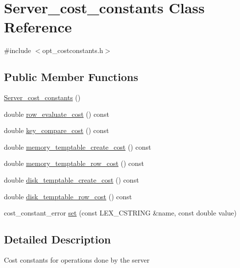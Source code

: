 \hypertarget{classServer__cost__constants}{}\section{Server\+\_\+cost\+\_\+constants Class Reference}
\label{classServer__cost__constants}


{\ttfamily \#include $<$opt\+\_\+costconstants.\+h$>$}

\subsection*{Public Member Functions}
\begin{DoxyCompactItemize}
\item 
\mbox{\hyperlink{classServer__cost__constants_ae46163107975303a2a4b5777b15989ee}{Server\+\_\+cost\+\_\+constants}} ()
\item 
double \mbox{\hyperlink{classServer__cost__constants_a0e8899c1b50ebe6a35a5bc4607c2eeef}{row\+\_\+evaluate\+\_\+cost}} () const
\item 
double \mbox{\hyperlink{classServer__cost__constants_afd5d1ddd74b8f18b52945fadce7fd1d8}{key\+\_\+compare\+\_\+cost}} () const
\item 
double \mbox{\hyperlink{classServer__cost__constants_a350765cfa9933e749b5c8098df8e1035}{memory\+\_\+temptable\+\_\+create\+\_\+cost}} () const
\item 
double \mbox{\hyperlink{classServer__cost__constants_a9de227818ce128b4f0dfc64d997f48df}{memory\+\_\+temptable\+\_\+row\+\_\+cost}} () const
\item 
double \mbox{\hyperlink{classServer__cost__constants_aef84ea79662a33a49a8393a71be58e79}{disk\+\_\+temptable\+\_\+create\+\_\+cost}} () const
\item 
double \mbox{\hyperlink{classServer__cost__constants_a21e6450b221e901707f374cfa5820bf4}{disk\+\_\+temptable\+\_\+row\+\_\+cost}} () const
\item 
cost\+\_\+constant\+\_\+error \mbox{\hyperlink{classServer__cost__constants_a5dff135f3610f4f0226debac4d13eeb9}{set}} (const L\+E\+X\+\_\+\+C\+S\+T\+R\+I\+NG \&name, const double value)
\end{DoxyCompactItemize}


\subsection{Detailed Description}
Cost constants for operations done by the server 

